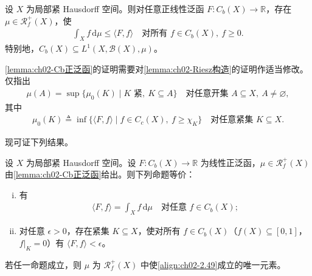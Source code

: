 \documentclass[../../main.tex]{subfiles}%
\begin{document}
\begin{lemma}\label{lemma:ch02-Cb正泛函}
设 $X$ 为局部紧 Hausdorff 空间。则对任意正线性泛函 $F:C_b(X)\to\mathbb R$，存在 $\mu\in\mathscr R^+_f(X)$，使
\begin{align}
\int_X f\,\mathrm{d}\mu\leqslant\langle F,f\rangle\quad\text{对所有 }f\in C_b(X),\ f\geqslant0. \label{align:ch02-2.46}
\end{align}
特别地，$C_b(X)\subseteq L^1(X,\mathscr B(X),\mu)$。
\end{lemma}

\cref{lemma:ch02-Cb正泛函}的证明需要对\cref{lemma:ch02-Riesz构造}的证明作适当修改。仅指出
\begin{align}
\mu(A)=\sup\{\mu_0(K)\mid K\text{ 紧},\ K\subseteq A\}\quad\text{对任意开集 }A\subseteq X,\ A\neq\varnothing , \label{align:ch02-2.47}
\end{align}
其中
\begin{align}
\mu_0(K)\triangleq \inf\{\langle F,f\rangle\mid f\in C_c(X),\ f\geqslant\chi_K\}\quad\text{对任意紧集 }K\subseteq X. \label{align:ch02-2.48}
\end{align}

现可证下列结果。

\begin{proposition}\label{proposition:ch02-Cb表示}
设 $X$ 为局部紧 Hausdorff 空间。设 $F:C_b(X)\to\mathbb R$ 为线性正泛函，$\mu\in\mathscr R^+_f(X)$ 由\cref{lemma:ch02-Cb正泛函}给出。则下列命题等价：
\begin{enumerate}[(i)]
\item 有
\begin{align}
\langle F,f\rangle=\int_X f\,\mathrm{d}\mu\quad\text{对任意 }f\in C_b(X); \label{align:ch02-2.49}
\end{align}
\item 对任意 $\epsilon>0$，存在紧集 $K\subseteq X$，使对所有 $f\in C_b(X)$（$f(X)\subseteq[0,1]$，$f|_K=0$）有 $\langle F,f\rangle<\epsilon$。
\end{enumerate}
若任一命题成立，则 $\mu$ 为 $\mathscr R^+_f(X)$ 中使\eqref{align:ch02-2.49}成立的唯一元素。
\end{proposition}
\end{document}
